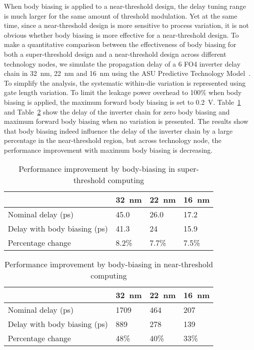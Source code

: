 When body biasing is applied to a near-threshold design, the delay tuning range is much larger for the same amount of threshold modulation.
Yet at the same time, since a near-threshold design is more sensitive to process variation, it is not obvious whether body biasing is more effective for a near-threshold design.
To make a quantitative comparison between the effectiveness of body biasing for both a super-threshold design and a near-threshold design across different technology nodes, we simulate the propagation delay of a 6 FO4 inverter delay chain in \SI{32}{\nano\meter}, \SI{22}{\nano\meter} and \SI{16}{\nano\meter} using the ASU Predictive Technology Model~\cite{PredictiveModel}.
To simplify the analysis, the systematic within-die variation is represented using gate length variation.
To limit the leakage power overhead to 100\% when body biasing is applied, the maximum forward body biasing is set to \SI{0.2}{\volt}.
Table~\ref{tbl:body1} and Table~\ref{tbl:body2} show the delay of the inverter chain for zero body biasing and maximum forward body biasing when no variation is presented.
The results show that body biasing indeed influence the delay of the inverter chain by a large percentage in the near-threshold region, but across technology node, the performance improvement with maximum body biasing is decreasing.

\begin{table}
  \caption{Performance improvement by body-biasing in super-threshold computing} 
  \centering 
  \label{tbl:body1}
  \begin{tabular}{ | l | l | l | l | }
    \hline
    & \SI{32}{\nano\meter} & \SI{22}{\nano\meter} & \SI{16}{\nano\meter} \\ \hline
    Nominal delay (ps) & 45.0 & 26.0 & 17.2 \\ \hline
    Delay with body biasing (ps)  & 41.3 & 24 & 15.9 \\  \hline
    Percentage change  & 8.2\% & 7.7\% & 7.5\% \\ 
    \hline
  \end{tabular}
\end{table}



\begin{table}
  \caption {Performance improvement by body-biasing in near-threshold computing}  
  \centering
  \label{tbl:body2}
  \begin{tabular}{ | l | l | l | l | }
    \hline
    & \SI{32}{\nano\meter} & \SI{22}{\nano\meter} & \SI{16}{\nano\meter} \\ \hline
    Nominal delay (ps) & 1709 & 464 & 207 \\ \hline
    Delay with body biasing (ps)  & 889 & 278 & 139 \\  \hline
    Percentage change  & 48\% & 40\% & 33\% \\ 
    \hline
  \end{tabular}
\end{table}

